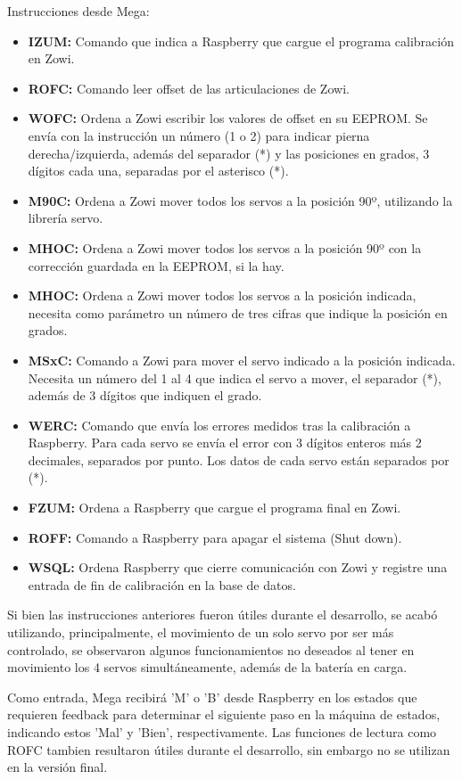 Instrucciones desde Mega:

\begin{itemize}
  \item \textbf{IZUM:} Comando que indica a Raspberry que cargue el programa calibración en Zowi.
  \item \textbf{ROFC:} Comando leer offset de las articulaciones de Zowi.
  \item \textbf{WOFC:} Ordena a Zowi escribir los valores de offset en su EEPROM. Se envía con la instrucción un número (1 o 2) para indicar pierna derecha/izquierda, además del separador (*) y las posiciones en grados, 3 dígitos cada una, separadas por el asterisco (*).
  \item \textbf{M90C:} Ordena a Zowi mover todos los servos a la posición 90º, utilizando la librería servo.
  \item \textbf{MHOC:} Ordena a Zowi mover todos los servos a la posición 90º con la corrección guardada en la EEPROM, si la hay.
  \item \textbf{MHOC:} Ordena a Zowi mover todos los servos a la posición indicada, necesita como parámetro un número de tres cifras que indique la posición en grados.
  \item \textbf{MSxC:} Comando a Zowi para mover el servo indicado a la posición indicada. Necesita un número del 1 al 4 que indica el servo a mover, el separador (*), además de 3 dígitos que indiquen el grado.
  \item \textbf{WERC:} Comando que envía los errores medidos tras la calibración a Raspberry. Para cada servo se envía el error con 3 dígitos enteros más 2 decimales, separados por punto. Los datos de cada servo están separados por (*).
  \item \textbf{FZUM:} Ordena a Raspberry que cargue el programa final en Zowi.
  \item \textbf{ROFF:} Comando a Raspberry para apagar el sistema (Shut down).
  \item \textbf{WSQL:} Ordena Raspberry que cierre comunicación con Zowi y registre una entrada de fin de calibración en la base de datos.
\end{itemize}

Si bien las instrucciones anteriores fueron útiles durante el desarrollo, se acabó utilizando, principalmente, el movimiento de un solo servo por ser más controlado, se observaron algunos funcionamientos no deseados al tener en movimiento los 4 servos simultáneamente, además de la batería en carga.

Como entrada, Mega recibirá 'M' o 'B' desde Raspberry en los estados que requieren feedback para determinar el siguiente paso en la máquina de estados, indicando estos 'Mal' y 'Bien', respectivamente. Las funciones de lectura como ROFC tambien resultaron útiles durante el desarrollo, sin embargo no se utilizan en la versión final.

